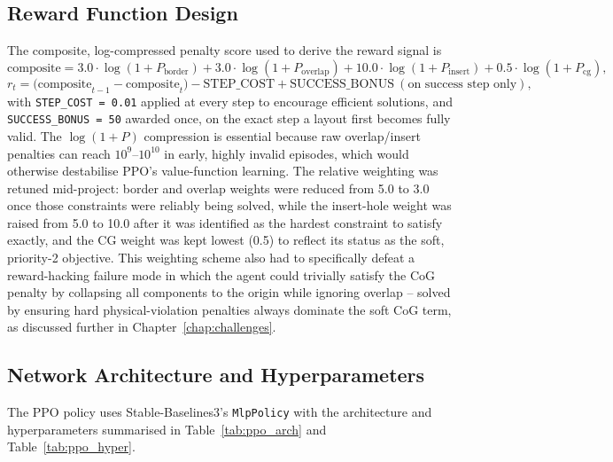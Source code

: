 \documentclass[11pt,a4paper,oneside]{report}
\begin{document}
\subsection{Reward Function Design}
\label{sec:reward_design}
The composite, log-compressed penalty score used to derive the reward signal is
\begin{equation}
\text{composite} = 3.0 \cdot \log(1{+}P_{\text{border}}) + 3.0 \cdot \log(1{+}P_{\text{overlap}}) + 10.0 \cdot \log(1{+}P_{\text{insert}}) + 0.5 \cdot \log(1{+}P_{\text{cg}}),
\end{equation}
\begin{equation}
r_t = \big(\text{composite}_{t-1} - \text{composite}_t\big) - \text{STEP\_COST} + \text{SUCCESS\_BONUS}\ (\text{on success step only}),
\end{equation}
with \texttt{STEP\_COST = 0.01} applied at every step to encourage efficient solutions, and \texttt{SUCCESS\_BONUS = 50} awarded once, on the exact step a layout first becomes fully valid. The $\log(1+P)$ compression is essential because raw overlap/insert penalties can reach $10^9$--$10^{10}$ in early, highly invalid episodes, which would otherwise destabilise PPO's value-function learning. The relative weighting was retuned mid-project: border and overlap weights were reduced from 5.0 to 3.0 once those constraints were reliably being solved, while the insert-hole weight was raised from 5.0 to 10.0 after it was identified as the hardest constraint to satisfy exactly, and the CG weight was kept lowest (0.5) to reflect its status as the soft, priority-2 objective. This weighting scheme also had to specifically defeat a reward-hacking failure mode in which the agent could trivially satisfy the CoG penalty by collapsing all components to the origin while ignoring overlap -- solved by ensuring hard physical-violation penalties always dominate the soft CoG term, as discussed further in Chapter~\ref{chap:challenges}.

\subsection{Network Architecture and Hyperparameters}
The PPO policy uses Stable-Baselines3's \texttt{MlpPolicy} with the architecture and hyperparameters summarised in Table~\ref{tab:ppo_arch} and Table~\ref{tab:ppo_hyper}.
\end{document}
